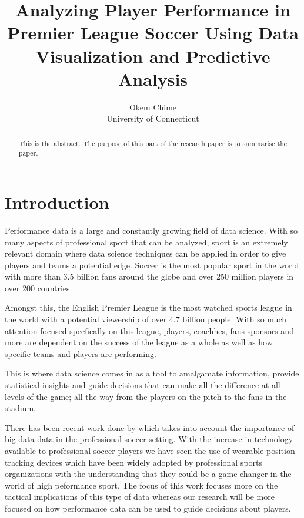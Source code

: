 \documentclass[12pt]{article}
\title{Analyzing Player Performance in Premier League Soccer Using 
Data Visualization and Predictive Analysis}
\author{Okem Chime\\
  University of Connecticut
}
\begin{document}
\maketitle

\begin{abstract}
This is the abstract. The purpose of this part of the research paper is to
summarise the paper.

\end{abstract}


\section{Introduction}
\label{sec:intro}




Performance data is a large and constantly growing field of data science. With
so many aspects of professional sport that can be analyzed, sport is an 
extremely relevant domain where data science techniques can be applied in order
to give players and teams a potential edge. Soccer is the most popular sport in
the world with more than 3.5 billion fans around the globe and over 250 million
players in over 200 countries.

Amongst this, the English Premier League is the 
most watched sports league in the world with a potential viewership of over 4.7 
billion people. With so much attention focused specfically on this league,
players, coachhes, fans sponsors and more are dependent on the success of the
league as a whole as well as how specific teams and players are performing.

This is where data science comes in as a tool to amalgamate information,
provide statistical insights and guide decisions that can make all the difference 
at all levels of the game; all the way from the players on the pitch to the fans
in the stadium.

There has been recent work done by \citet{goes2021unlocking} which takes into 
account the importance of big data data in the professional soccer setting. 
With the increase in technology available to professional soccer players we have
seen the use of wearable position tracking devices which have been widely 
adopted by professional sports organizations with the understanding that they
could be a game changer in the world of high peformance sport. The focus of this 
work focuses more on the tactical implications of this type of data whereas
our research will be more focused on how performance data can be used to guide
decisions about players.
\end{document}
